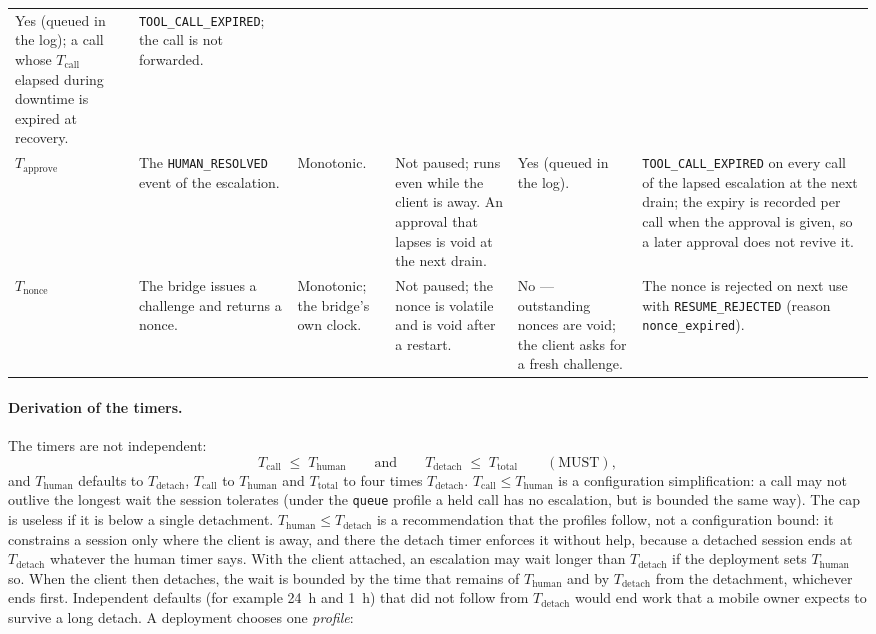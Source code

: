 \begin{table}[htbp]
\begin{tabularx}{\columnwidth}{l X X X X X}
Yes (queued in the log); a call whose $T_{\text{call}}$ elapsed during downtime is expired at recovery. &
\texttt{TOOL\_CALL\_EXPIRED}; the call is not forwarded. \\
$T_{\text{approve}}$ &
The \texttt{HUMAN\_RESOLVED} event of the escalation. &
Monotonic. &
Not paused; runs even while the client is away. An approval that lapses is void at the next drain. &
Yes (queued in the log). &
\texttt{TOOL\_CALL\_EXPIRED} on every call of the lapsed escalation at the next drain; the expiry is recorded per call when the approval is given, so a later approval does not revive it. \\
$T_{\text{nonce}}$ &
The bridge issues a challenge and returns a nonce. &
Monotonic; the bridge's own clock. &
Not paused; the nonce is volatile and is void after a restart. &
No --- outstanding nonces are void; the client asks for a fresh challenge. &
The nonce is rejected on next use with \texttt{RESUME\_REJECTED} (reason \texttt{nonce\_expired}). \\
\bottomrule
\end{tabularx}
\end{table}

\paragraph{Derivation of the timers.} The timers are not independent:
\[
T_{\text{call}} \;\leq\; T_{\text{human}}
\qquad\text{and}\qquad
T_{\text{detach}} \;\leq\; T_{\text{total}}
\qquad (\text{MUST}),
\]
and $T_{\text{human}}$ defaults to $T_{\text{detach}}$,
$T_{\text{call}}$ to $T_{\text{human}}$ and $T_{\text{total}}$ to four
times $T_{\text{detach}}$. $T_{\text{call}} \leq T_{\text{human}}$ is a configuration simplification:
a call may not outlive the longest wait the session tolerates (under the
\texttt{queue} profile a held call has no escalation, but is bounded the
same way). The cap is useless if it is below a single detachment.
$T_{\text{human}} \leq T_{\text{detach}}$ is a recommendation that the
profiles follow, not a configuration bound: it constrains a session only
where the client is away, and there the detach timer enforces it without
help, because a detached session ends at $T_{\text{detach}}$ whatever the
human timer says. With the client attached, an escalation may wait longer
than $T_{\text{detach}}$ if the deployment sets $T_{\text{human}}$ so. When
the client then detaches, the wait is bounded by the time that remains of
$T_{\text{human}}$ and by $T_{\text{detach}}$ from the detachment,
whichever ends first. Independent defaults (for example 24~h and 1~h) that
did not follow from $T_{\text{detach}}$ would end work that a mobile owner
expects to survive a long detach. A deployment chooses one
\emph{profile}:

